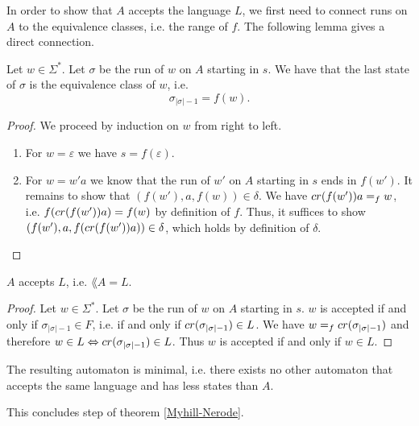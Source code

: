 

In order to show that $A$ accepts the language $L$, we first need to connect runs on $A$ to the equivalence classes, i.e. the range of $f$.
The following lemma gives a direct connection.

\begin{lemma}
    \label{nerode_to_dfa_run}
    Let $w \in \Sigma^*$. Let $\sigma$ be the run of $w$ on $A$ starting in $s$. We have that the last state of $\sigma$ is the equivalence class of $w$, i.e. 
    \begin{equation*}
        \sigma_{|\sigma|-1} = f(w).
    \end{equation*}
\end{lemma}
\begin{proof}
    We proceed by induction on $w$ from right to left.
    \begin{enumerate}
        \item For $w = \varepsilon$ we have $s = f(\varepsilon)$.
        \item For $w = w'a$ we know that the run of $w'$ on $A$ starting in $s$ ends in $f(w')$. 
            It remains to show that $(f(w'), a, f(w)) \in \delta$.
            We have $cr(f(w'))a =_f w$, i.e. $f(cr(f(w'))a) = f(w)$ by definition of $f$.
            Thus, it suffices to show $(f(w'), a, f(cr(f(w'))a)) \in \delta$, which holds by definition of $\delta$.
    \end{enumerate}
\end{proof}

\begin{theorem}
    \label{nerode_to_dfa_correct}
    $A$ accepts $L$, i.e. $\lang{A} = L$.
\end{theorem}
\begin{proof}
    Let $w \in \Sigma^*$. Let $\sigma$ be the run of $w$ on $A$ starting in $s$. 
    $w$ is accepted if and only if $\sigma_{|\sigma|-1} \in F$, i.e. if and only if $cr(\sigma_{|\sigma|-1}) \in L$.
    We have $w =_f cr(\sigma_{|\sigma|-1})$ and therefore $w \in L \Leftrightarrow cr(\sigma_{|\sigma|-1}) \in L$.
    Thus $w$ is accepted if and only if $w \in L$.
\end{proof}

The resulting automaton is minimal, i.e. there exists no other automaton that accepts the same language and has less states than $A$.

This concludes step  of theorem \ref{Myhill-Nerode}.

